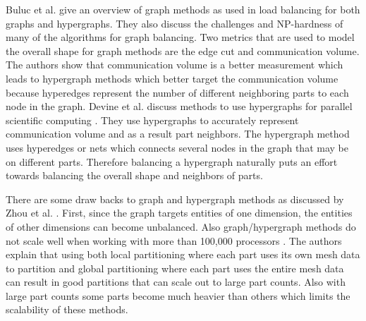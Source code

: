 \documentclass{thesis}
\begin{document}
Buluc et al. \cite{surveygraph} give an overview of graph methods as used in 
load balancing 
for both graphs and hypergraphs. They also discuss the challenges and 
NP-hardness of many of the algorithms for graph balancing. Two metrics that 
are used to model the overall shape for graph methods are the edge cut and 
communication volume. The authors show that communication volume is a better 
measurement which leads to hypergraph methods which better target the 
communication volume because hyperedges represent the number of different 
neighboring parts to each node in the graph. Devine et al. discuss methods 
to use hypergraphs for parallel scientific computing \cite{hypergraph}. They
use hypergraphs to accurately represent communication volume and as a result
part neighbors. The hypergraph method uses hyperedges or nets which connects 
several nodes in the graph that may be on different parts. Therefore 
balancing a hypergraph naturally puts an effort towards balancing the overall
shape and neighbors of parts. 

There are some draw backs to graph and hypergraph methods as discussed 
by Zhou et al. \cite{zhougraph}. First, since the graph targets 
entities of one dimension, the entities of other dimensions can become 
unbalanced. Also graph/hypergraph methods do not scale well when working with 
more than 100,000 processors \cite{zhougraph}. The authors explain that 
using both local partitioning where each part uses its own mesh data to 
partition  and global partitioning where each part uses the entire mesh 
data can result in good partitions that can scale out to large part counts. 
Also with large part counts some parts become much heavier than others which 
limits the scalability of these methods.
\end{document}
